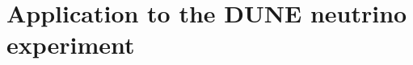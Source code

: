 \chapter{Application to the DUNE neutrino experiment\label{chap:application-dune}}
\cite{dune1, dune2, dune3, dune4}